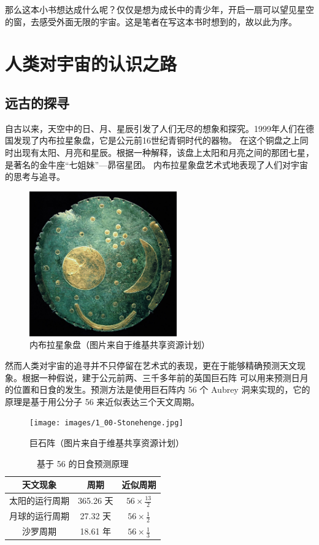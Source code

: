 \documentclass[a4paper,10.5pt]{article}
\begin{document}
那么这本小书想达成什么呢？仅仅是想为成长中的青少年，开启一扇可以望见星空的窗，去感受外面无限的宇宙。这是笔者在写这本书时想到的，故以此为序。

\newpage

\section{人类对宇宙的认识之路}

\subsection{远古的探寻}

自古以来，天空中的日、月、星辰引发了人们无尽的想象和探究。1999年人们在德国发现了内布拉星象盘，它是公元前16世纪青铜时代的器物。
在这个铜盘之上同时出现有太阳、月亮和星辰。根据一种解释，该盘上太阳和月亮之间的那团七星，是著名的金牛座“七姐妹”—昴宿星团。
内布拉星象盘艺术式地表现了人们对宇宙的思考与追寻。

\begin{figure}[ht]
\centering
\includegraphics[width=2.5in]{images/1_01-Nebra_sky_disk.jpg}
\caption{内布拉星象盘（图片来自于维基共享资源计划）}
\end{figure}

然而人类对宇宙的追寻并不只停留在艺术式的表现，更在于能够精确预测天文现象。根据一种假说，建于公元前两、三千多年前的英国巨石阵
可以用来预测日月的位置和日食的发生。预测方法是使用巨石阵内 56 个 Aubrey 洞来实现的，它的原理是基于用公分子 56 来近似表达三个天文周期。

\begin{figure}[ht]
\centering
\texttt{[image: images/1\_00-Stonehenge.jpg]}
\caption{巨石阵（图片来自于维基共享资源计划）}
\end{figure}

\begin{table}[tbhp]
\centering
\begin{tabular}{|c|c|c|}
\hline
天文现象 & 周期 & 近似周期 \\
\hline
太阳的运行周期 & 365.26 天 & $ 56 \times \frac{13}{2} $ \\
\hline
月球的运行周期 & 27.32 天 & $ 56 \times \frac{1}{2} $ \\
\hline
沙罗周期 & 18.61 年 & $ 56 \times \frac{1}{3} $ \\
\hline
\end{tabular}
\caption{基于 56 的日食预测原理}
\end{table}
\end{document}

